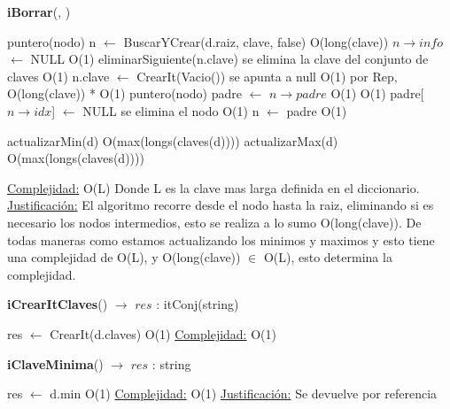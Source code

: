 \begin{algorithm}[H]{\textbf{iBorrar}(, )}
	\begin{algorithmic}[1]

		\State puntero(nodo) n $\gets$ BuscarYCrear(d.raiz, clave, false)     \Comment O(long(clave))
		\State $n \rightarrow info$ $\gets$ NULL 					\Comment O(1)
		\State eliminarSiguiente(n.clave)							\Comment se elimina la clave del conjunto de claves O(1)
		\State n.clave $\gets$ CrearIt(Vacio())				\Comment se apunta a null O(1)
			\Comment por Rep, O(long(clave)) * O(1)
			\State puntero(nodo) padre $\gets$ $n \rightarrow padre$		\Comment O(1)
			 														\Comment O(1)
				\State padre[$n \rightarrow idx$] $\gets$ NULL			\Comment se elimina el nodo O(1)					
			\EndIf
			\State n $\gets$ padre								\Comment O(1)
		\EndWhile
	
		\State actualizarMin(d)		\Comment O(max(longs(claves(d))))
		\State actualizarMax(d)		\Comment O(max(longs(claves(d))))

		\medskip
		\Statex \underline{Complejidad:} O(L) Donde L es la clave mas larga definida en el diccionario.
		\Statex \underline{Justificación:} El algoritmo recorre desde el nodo hasta la raiz, eliminando si es necesario los nodos intermedios, esto se realiza a lo sumo O(long(clave)). De todas maneras como estamos actualizando los minimos y maximos y esto tiene una complejidad de O(L), y O(long(clave)) $\in$ O(L), esto determina la complejidad.
    \end{algorithmic}
\end{algorithm}



\begin{algorithm}[H]{\textbf{iCrearItClaves}() $\to$ $res$ : itConj(string)}
	\begin{algorithmic}[1]
		\State res $\gets$ CrearIt(d.claves)									    \Comment O(1)
		\medskip
		\Statex \underline{Complejidad:} O(1)
    \end{algorithmic}
\end{algorithm}


\begin{algorithm}[H]{\textbf{iClaveMinima}() $\to$ $res$ : string}
	\begin{algorithmic}[1]
		\State res $\gets$ d.min								    \Comment O(1)
		\medskip
		\Statex \underline{Complejidad:} O(1)
		\Statex \underline{Justificación:} Se devuelve por referencia	
    \end{algorithmic}
\end{algorithm}



